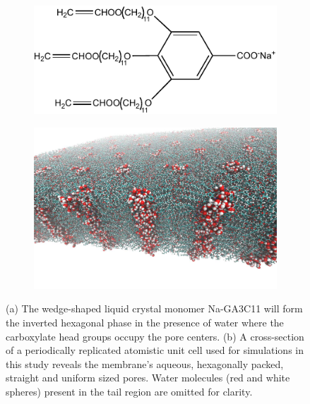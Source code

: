\documentclass[journal=jctcce,manuscript=article]{achemso}
\begin{document}
  \begin{figure}
  \centering
  \begin{subfigure}{0.4\textwidth}
  \centering
  \vspace{1.1cm}
  \includegraphics[width=\textwidth]{NaGA3C11.pdf}
  \vspace{0.6cm}
  \caption{}\label{fig:monomer_structure}
  \end{subfigure}
  \begin{subfigure}{0.5\textwidth}
  \centering
  \includegraphics[width=\textwidth]{membrane_profile.pdf}
  \caption{}\label{fig:membrane_profile}
  \end{subfigure}
  \caption{(a) The wedge-shaped liquid crystal monomer Na-GA3C11 will form the inverted
  hexagonal phase in the presence of water where the carboxylate head groups occupy the
  pore centers. (b) A cross-section of a periodically replicated atomistic unit cell 
  used for simulations in this study reveals the membrane's aqueous, hexagonally packed,
  straight and uniform sized pores. Water molecules (red and white spheres) present in 
  the tail region are omitted for clarity.}\label{fig:membrane_structure}
  \end{figure}
  
\end{document}
